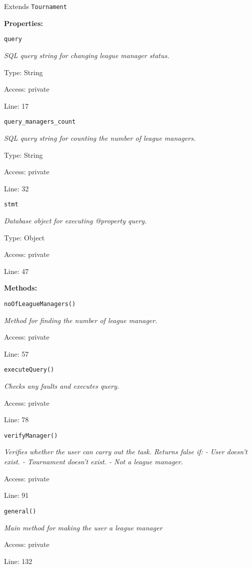 Extends \texttt{Tournament}

\textbf{Properties:}

\texttt{query}

{\scriptsize
\textit{SQL query string for changing league manager status.}

Type: String

Access: private

Line: 17

}
\texttt{query\_managers\_count}

{\scriptsize
\textit{SQL query string for counting the number of league managers.}

Type: String

Access: private

Line: 32

}
\texttt{stmt}

{\scriptsize
\textit{Database object for executing @property query.}

Type: Object

Access: private

Line: 47

}
\textbf{Methods:}

\texttt{noOfLeagueManagers()}

{\scriptsize
\textit{Method for finding the number of league manager.}

Access: private

Line: 57

}

\texttt{executeQuery()}

{\scriptsize
\textit{Checks any faults and executes query.}

Access: private

Line: 78

}

\texttt{verifyManager()}

{\scriptsize
\textit{Verifies whether the user can carry out the task.
Returns false if:
- User doesn't exist.
- Tournament doesn't exist.
- Not a league manager.}

Access: private

Line: 91

}

\texttt{general()}

{\scriptsize
\textit{Main method for making the user a league manager}

Access: private

Line: 132

}

